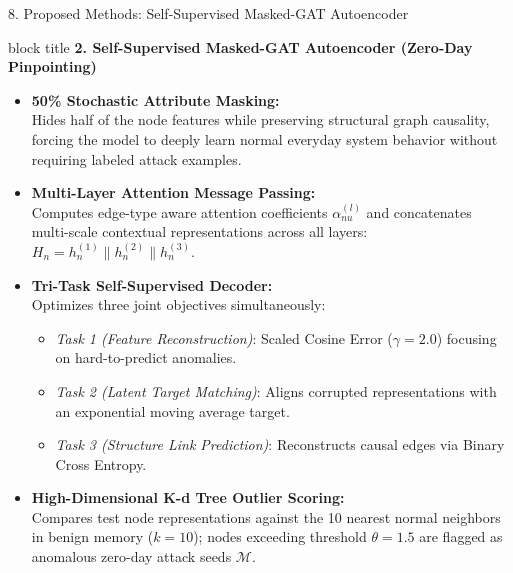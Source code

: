 \documentclass[aspectratio=169,10pt]{beamer}
\begin{document}
\begin{frame}{8. Proposed Methods: Self-Supervised Masked-GAT Autoencoder}
\vspace{0.15em}
\begin{beamercolorbox}[rounded=true,shadow=false,sep=0.38em,wd=\textwidth]{block title}
\textbf{\scriptsize 2. Self-Supervised Masked-GAT Autoencoder (Zero-Day Pinpointing)}
\end{beamercolorbox}
\vspace{0.15em}
{\fontsize{7.4pt}{10.6pt}\selectfont
\begin{itemize}\itemsep0.25em
  \item \textbf{50\% Stochastic Attribute Masking:}\\
  Hides half of the node features while preserving structural graph causality, forcing the model to deeply learn normal everyday system behavior without requiring labeled attack examples.
  \item \textbf{Multi-Layer Attention Message Passing:}\\
  Computes edge-type aware attention coefficients $\alpha_{nu}^{(l)}$ and concatenates multi-scale contextual representations across all layers: $H_n = h_n^{(1)} \parallel h_n^{(2)} \parallel h_n^{(3)}$.
  \item \textbf{Tri-Task Self-Supervised Decoder:}\\
  Optimizes three joint objectives simultaneously:
  \begin{itemize}\itemsep0.12em
    \item \textit{Task 1 (Feature Reconstruction)}: Scaled Cosine Error ($\gamma=2.0$) focusing on hard-to-predict anomalies.
    \item \textit{Task 2 (Latent Target Matching)}: Aligns corrupted representations with an exponential moving average target.
    \item \textit{Task 3 (Structure Link Prediction)}: Reconstructs causal edges via Binary Cross Entropy.
  \end{itemize}
  \item \textbf{High-Dimensional K-d Tree Outlier Scoring:}\\
  Compares test node representations against the 10 nearest normal neighbors in benign memory ($k=10$); nodes exceeding threshold $\theta=1.5$ are flagged as anomalous zero-day attack seeds $\mathcal{M}$.
\end{itemize}
}
\end{frame}
\end{document}
